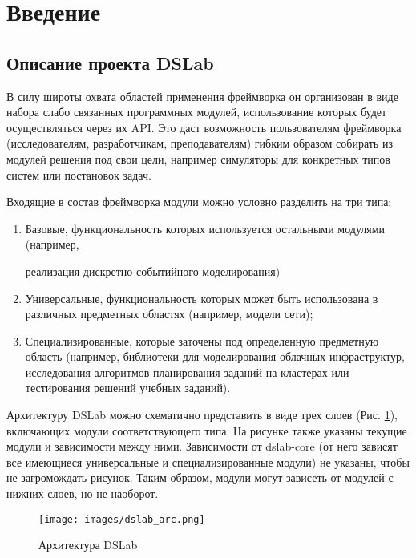 \newpage

\section{Введение}

\subsection{Описание проекта DSLab}

В силу широты охвата областей применения фреймворка он организован в виде набора слабо связанных программных модулей, использование которых будет осуществляться через их API. Это даст возможность пользователям фреймворка (исследователям, разработчикам, преподавателям) гибким образом собирать из модулей решения под свои цели, например симуляторы для конкретных типов систем или постановок задач.

Входящие в состав фреймворка модули можно условно разделить на три типа:
\begin{enumerate}
    \item 
    Базовые, функциональность которых используется остальными модулями (например, 
    
    реализация дискретно-событийного моделирования)
    \item
    Универсальные, функциональность которых может быть использована в различных предметных областях (например, модели сети);
    \item
    Специализированные, которые заточены под определенную предметную область (например, библиотеки для моделирования облачных инфраструктур, исследования алгоритмов планирования заданий на кластерах или тестирования решений учебных заданий).
\end{enumerate}

Архитектуру DSLab можно схематично представить в виде трех слоев (Рис. \ref{dslab_arc}), включающих модули соответствующего типа. На рисунке также указаны текущие модули и зависимости между ними. Зависимости от dslab-core (от него зависят все имеющиеся универсальные и специализированные модули) не указаны, чтобы не загромождать рисунок. Таким образом, модули могут зависеть от модулей с нижних слоев, но не наоборот.

\begin{figure}[H]
    \centering
    \texttt{[image: images/dslab\_arc.png]}
    \caption{Архитектура DSLab}
    \label{dslab_arc}
\end{figure}

